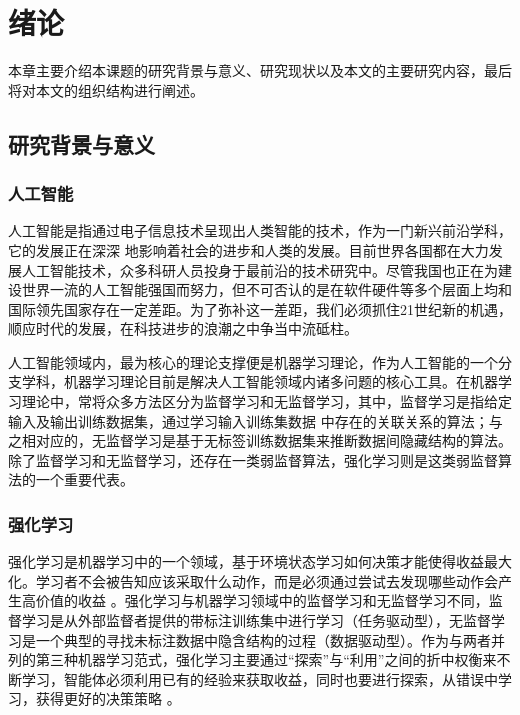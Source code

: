 
\chapter{绪论}

本章主要介绍本课题的研究背景与意义、研究现状以及本文的主要研究内容，最后将对本文的组织结构进行阐述。

\section{研究背景与意义}

\subsection{人工智能}

人工智能是指通过电子信息技术呈现出人类智能的技术，作为一门新兴前沿学科，它的发展正在深深 地影响着社会的进步和人类的发展。目前世界各国都在大力发展人工智能技术，众多科研人员投身于最前沿的技术研究中。尽管我国也正在为建设世界一流的人工智能强国而努力，但不可否认的是在软件硬件等多个层面上均和国际领先国家存在一定差距。为了弥补这一差距，我们必须抓住21世纪新的机遇，顺应时代的发展，在科技进步的浪潮之中争当中流砥柱。

人工智能领域内，最为核心的理论支撑便是机器学习理论，作为人工智能的一个分支学科，机器学习理论目前是解决人工智能领域内诸多问题的核心工具。在机器学习理论中，常将众多方法区分为监督学习和无监督学习\cite{goodfellow2016deep}，其中，监督学习是指给定输入及输出训练数据集，通过学习输入训练集数据 中存在的关联关系的算法；与之相对应的，无监督学习是基于无标签训练数据集来推断数据间隐藏结构的算法\cite{goodfellow2016deep}\cite{bishop2006pattern}\cite{2012statsmethods}。除了监督学习和无监督学习，还存在一类弱监督算法，强化学习则是这类弱监督算法的一个重要代表。

\subsection{强化学习}

强化学习是机器学习中的一个领域，基于环境状态学习如何决策才能使得收益最大化。学习者不会被告知应该采取什么动作，而是必须通过尝试去发现哪些动作会产生高价值的收益 \cite{sutton2018reinforcement}。强化学习与机器学习领域中的监督学习和无监督学习不同，监督学习是从外部监督者提供的带标注训练集中进行学习（任务驱动型），无监督学习是一个典型的寻找未标注数据中隐含结构的过程（数据驱动型）。作为与两者并列的第三种机器学习范式，强化学习主要通过“探索”与“利用”之间的折中权衡来不断学习，智能体必须利用已有的经验来获取收益，同时也要进行探索，从错误中学习，获得更好的决策策略 \cite{kaelbling1996reinforcement}。

